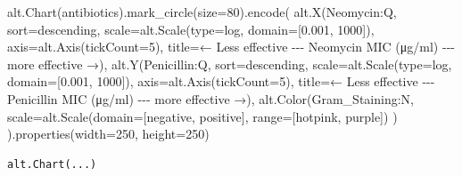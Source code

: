 \documentclass[
  letterpaper,
  DIV=11,
  numbers=noendperiod]{scrartcl}
\newenvironment{Shaded}{\begin{snugshade}}{\end{snugshade}}
\newcommand{\BuiltInTok}[1]{\textcolor[rgb]{0.00,0.23,0.31}{#1}}
\newcommand{\DecValTok}[1]{\textcolor[rgb]{0.68,0.00,0.00}{#1}}
\newcommand{\FloatTok}[1]{\textcolor[rgb]{0.68,0.00,0.00}{#1}}
\newcommand{\NormalTok}[1]{\textcolor[rgb]{0.00,0.23,0.31}{#1}}
\newcommand{\OperatorTok}[1]{\textcolor[rgb]{0.37,0.37,0.37}{#1}}
\newcommand{\StringTok}[1]{\textcolor[rgb]{0.13,0.47,0.30}{#1}}
\begin{document}
\begin{Shaded}
\begin{Highlighting}[]
\NormalTok{alt.Chart(antibiotics).mark\_circle(size}\OperatorTok{=}\DecValTok{80}\NormalTok{).encode(}
\NormalTok{    alt.X(}\StringTok{\textquotesingle{}Neomycin:Q\textquotesingle{}}\NormalTok{,}
\NormalTok{          sort}\OperatorTok{=}\StringTok{\textquotesingle{}descending\textquotesingle{}}\NormalTok{,}
\NormalTok{          scale}\OperatorTok{=}\NormalTok{alt.Scale(}\BuiltInTok{type}\OperatorTok{=}\StringTok{\textquotesingle{}log\textquotesingle{}}\NormalTok{, domain}\OperatorTok{=}\NormalTok{[}\FloatTok{0.001}\NormalTok{, }\DecValTok{1000}\NormalTok{]),}
\NormalTok{          axis}\OperatorTok{=}\NormalTok{alt.Axis(tickCount}\OperatorTok{=}\DecValTok{5}\NormalTok{),}
\NormalTok{          title}\OperatorTok{=}\StringTok{\textquotesingle{}← Less effective {-}{-}{-} Neomycin MIC (μg/ml) {-}{-}{-} more effective →\textquotesingle{}}\NormalTok{),}
\NormalTok{    alt.Y(}\StringTok{\textquotesingle{}Penicillin:Q\textquotesingle{}}\NormalTok{,}
\NormalTok{          sort}\OperatorTok{=}\StringTok{\textquotesingle{}descending\textquotesingle{}}\NormalTok{,}
\NormalTok{          scale}\OperatorTok{=}\NormalTok{alt.Scale(}\BuiltInTok{type}\OperatorTok{=}\StringTok{\textquotesingle{}log\textquotesingle{}}\NormalTok{, domain}\OperatorTok{=}\NormalTok{[}\FloatTok{0.001}\NormalTok{, }\DecValTok{1000}\NormalTok{]),}
\NormalTok{          axis}\OperatorTok{=}\NormalTok{alt.Axis(tickCount}\OperatorTok{=}\DecValTok{5}\NormalTok{),}
\NormalTok{          title}\OperatorTok{=}\StringTok{\textquotesingle{}← Less effective {-}{-}{-} Penicillin MIC (μg/ml) {-}{-}{-} more effective →\textquotesingle{}}\NormalTok{),}
\NormalTok{    alt.Color(}\StringTok{\textquotesingle{}Gram\_Staining:N\textquotesingle{}}\NormalTok{,}
\NormalTok{          scale}\OperatorTok{=}\NormalTok{alt.Scale(domain}\OperatorTok{=}\NormalTok{[}\StringTok{\textquotesingle{}negative\textquotesingle{}}\NormalTok{, }\StringTok{\textquotesingle{}positive\textquotesingle{}}\NormalTok{], }\BuiltInTok{range}\OperatorTok{=}\NormalTok{[}\StringTok{\textquotesingle{}hotpink\textquotesingle{}}\NormalTok{, }\StringTok{\textquotesingle{}purple\textquotesingle{}}\NormalTok{])}
\NormalTok{    )}
\NormalTok{).properties(width}\OperatorTok{=}\DecValTok{250}\NormalTok{, height}\OperatorTok{=}\DecValTok{250}\NormalTok{)}
\end{Highlighting}
\end{Shaded}

\begin{verbatim}
alt.Chart(...)
\end{verbatim}
\end{document}
